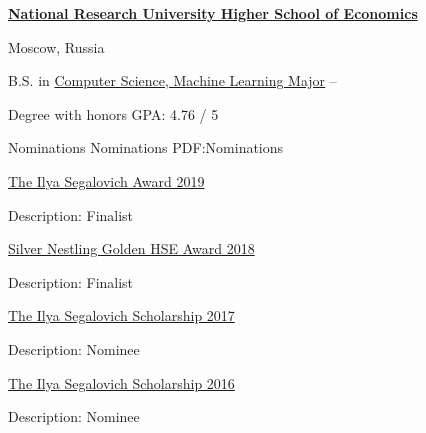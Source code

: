\documentclass[letterpaper,MMMyyyy,nonstopmode]{simpleresumecv}
\begin{document}
\begin{Body}
\Entry
\href{https://www.hse.ru/en/}
{\textbf{National Research University Higher School of Economics}}
\par
Moscow, Russia

\Gap
\BulletItem
B.S. in
\href{https://www.hse.ru/en/ba/ami/}
{Computer Science, Machine Learning Major}
\hfill
{} --
\begin{Detail}
\SubBulletItem
Degree with honors
\SubBulletItem
GPA: 4.76 / 5
\end{Detail}



\Section
{Nominations}
{Nominations}
{PDF:Nominations}

\BulletItem
\href{https://cs.hse.ru/en/stipend/}{The Ilya Segalovich Award 2019}
\begin{Detail}
\Item
Description: Finalist
\end{Detail}

\BulletItem
\href{https://www.hse.ru/gold/cm/silver/2018/gadetsky}{Silver Nestling Golden HSE Award 2018}
\begin{Detail}
\Item
Description: Finalist
\end{Detail}

\BulletItem
\href{https://yandex.com/scholarships/students}{The Ilya Segalovich Scholarship 2017}
\begin{Detail}
\Item
Description: Nominee
\end{Detail}

\BulletItem
\href{https://yandex.com/scholarships/students}{The Ilya Segalovich Scholarship 2016}
\begin{Detail}
\Item
Description: Nominee
\end{Detail}


\iffalse

\Section
{Languages}
{Languages}
{PDF:Languages}

\BulletItem
Russian: Mother tongue.

\Gap
\BulletItem
English: Fluent


\Section
{Skills}
{Skills}
{PDF:Skills}

\BulletItem
Machine Learning, Deep Learning, Probabilistic Machine Learning

\BulletItem
Python, Pytorch, Feel free with Linux
\fi


\end{Body}
\end{document}
